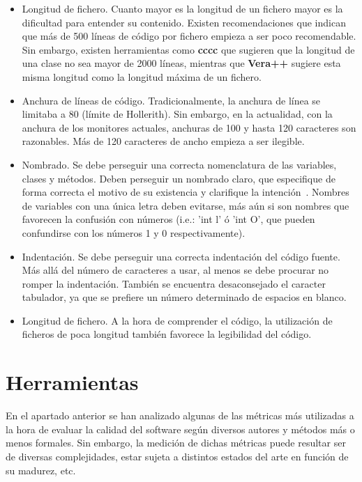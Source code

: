 \documentclass[11pt]{article}
\begin{document}
\begin{itemize}
\item{Longitud de fichero}. Cuanto mayor es la longitud de un fichero mayor es la dificultad para entender su contenido\cite{unclebob:cleancode}. Existen recomendaciones que indican que más de 500 líneas de código por fichero empieza a ser poco recomendable. Sin embargo, existen herramientas como \textbf{cccc} que sugieren que la longitud de una clase no sea mayor de 2000 líneas, mientras que \textbf{Vera++} sugiere esta misma longitud como la longitud máxima de un fichero.
\item{Anchura de líneas de código}. Tradicionalmente, la anchura de línea se limitaba a 80 (límite de Hollerith). Sin embargo, en la actualidad, con la anchura de los monitores actuales, anchuras de 100 y hasta 120 caracteres son razonables. Más de 120 caracteres de ancho empieza a ser ilegible.
\item{Nombrado}. Se debe perseguir una correcta nomenclatura de las variables, clases y métodos. Deben perseguir un nombrado claro, que especifique de forma correcta el motivo de su existencia y clarifique la intención~\cite{unclebob:cleancode}. Nombres de variables con una única letra deben evitarse, más aún si son nombres que favorecen la confusión con números (i.e.: 'int l' ó 'int O', que pueden confundirse con los números 1 y 0 respectivamente). 
\item{Indentación}. Se debe perseguir una correcta indentación del código fuente. Más allá del número de caracteres a usar, al menos se debe procurar no romper la indentación. También se encuentra desaconsejado el caracter tabulador, ya que se prefiere un número determinado de espacios en blanco.
\item{Longitud de fichero}. A la hora de comprender el código, la utilización de ficheros de poca longitud también favorece la legibilidad del código.
\end{itemize}

\section{Herramientas}

En el apartado anterior se han analizado algunas de las métricas más utilizadas a la hora de evaluar la calidad del software según diversos autores y métodos más o menos formales. Sin embargo, la medición de dichas métricas puede resultar ser de diversas complejidades, estar sujeta a distintos estados del arte en función de su madurez, etc.
\end{document}
